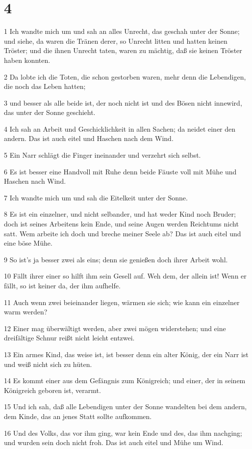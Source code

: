 \chapter{4}

\par 1 Ich wandte mich um und sah an alles Unrecht, das geschah unter der Sonne; und siehe, da waren die Tränen derer, so Unrecht litten und hatten keinen Tröster; und die ihnen Unrecht taten, waren zu mächtig, daß sie keinen Tröster haben konnten.
\par 2 Da lobte ich die Toten, die schon gestorben waren, mehr denn die Lebendigen, die noch das Leben hatten;
\par 3 und besser als alle beide ist, der noch nicht ist und des Bösen nicht innewird, das unter der Sonne geschieht.
\par 4 Ich sah an Arbeit und Geschicklichkeit in allen Sachen; da neidet einer den andern. Das ist auch eitel und Haschen nach dem Wind.
\par 5 Ein Narr schlägt die Finger ineinander und verzehrt sich selbst.
\par 6 Es ist besser eine Handvoll mit Ruhe denn beide Fäuste voll mit Mühe und Haschen nach Wind.
\par 7 Ich wandte mich um und sah die Eitelkeit unter der Sonne.
\par 8 Es ist ein einzelner, und nicht selbander, und hat weder Kind noch Bruder; doch ist seines Arbeitens kein Ende, und seine Augen werden Reichtums nicht satt. Wem arbeite ich doch und breche meiner Seele ab? Das ist auch eitel und eine böse Mühe.
\par 9 So ist's ja besser zwei als eins; denn sie genießen doch ihrer Arbeit wohl.
\par 10 Fällt ihrer einer so hilft ihm sein Gesell auf. Weh dem, der allein ist! Wenn er fällt, so ist keiner da, der ihm aufhelfe.
\par 11 Auch wenn zwei beieinander liegen, wärmen sie sich; wie kann ein einzelner warm werden?
\par 12 Einer mag überwältigt werden, aber zwei mögen widerstehen; und eine dreifältige Schnur reißt nicht leicht entzwei.
\par 13 Ein armes Kind, das weise ist, ist besser denn ein alter König, der ein Narr ist und weiß nicht sich zu hüten.
\par 14 Es kommt einer aus dem Gefängnis zum Königreich; und einer, der in seinem Königreich geboren ist, verarmt.
\par 15 Und ich sah, daß alle Lebendigen unter der Sonne wandelten bei dem andern, dem Kinde, das an jenes Statt sollte aufkommen.
\par 16 Und des Volks, das vor ihm ging, war kein Ende und des, das ihm nachging; und wurden sein doch nicht froh. Das ist auch eitel und Mühe um Wind.

